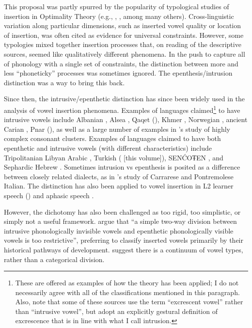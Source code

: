 \documentclass[output=paper,colorlinks,citecolor=brown]{langscibook}
\begin{document}
\begin{sloppypar}
This proposal was partly spurred by the popularity of typological studies of insertion in Optimality Theory (e.g., \citealt{kitto1999correspondence}, \citealt{fleischhacker2005similarity}, among many others). Cross-linguistic variation along particular dimensions, such as inserted vowel quality or location of insertion, was often cited as evidence for universal constraints. However, some typologies mixed together insertion processes that, on reading of the descriptive sources, seemed like qualitatively different phenomena. In the push to capture all of phonology with a single set of constraints, the distinction between more and less “phoneticky” processes was sometimes ignored. The epenthesis\slash intrusion distinction was a way to bring this back. 
\end{sloppypar}

Since then, the intrusive\slash epenthetic distinction has since been widely used in the analysis of vowel insertion phenomena. Examples of languages claimed\footnote{These are offered as examples of how the theory has been applied; I do not necessarily agree with all of the classifications mentioned in this paragraph. Also, note that some of these sources use the term “excrescent vowel” rather than “intrusive vowel”, but adopt an explicitly gestural definition of excrescence that is in line with what I call intrusion.} to have intrusive vowels include Albanian \citep{canalis2007extent}, Alsea \citep{buckley2007vowel}, Qaqet (\citealt{tabain2022qaqet}), Khmer \citep{butler2015approaching}, Norwegian \citep{garmann2021cross}, ancient Carian \citep{adiego2019consonant}, Pnar (\citealt{ring2014intrusive}), as well as a large number of examples in \citet{easterday2017highly}'s study of highly complex consonant clusters. Examples of languages claimed to have both epenthetic and intrusive vowels (with different characteristics) include Tripolitanian Libyan Arabic \citep{heselwood2015epenthetic}, Turkish (\citealt{Bellik2019a, chapters/07.Bellik} [this volume]), SENĆOŦEN \citep{leonard2007preliminary}, and Sephardic Hebrew \citep{pariente2010pharyngeal}. Sometimes intrusion vs epenthesis is posited as a difference between closely related dialects, as in \citet{caviraniepenthetic}'s study of Carrarese and Pontremolese Italian. The distinction has also been applied to vowel insertion in L2 learner speech (\citealt{nogita2012not}) and aphasic speech \citep{buchwald2006evidence}. 

However, the dichotomy has also been challenged as too rigid, too simplistic, or simply not a useful framework. \citet{Blevins&Pawley} argue that “a simple two-way division between intrusive phonologically invisible vowels and epenthetic phonologically visible vowels is too restrictive”, preferring to classify inserted vowels primarily by their historical pathways of development. \citet{hammond2014vowel} suggest there is a continuum of vowel types, rather than a categorical division. 
\end{document}
